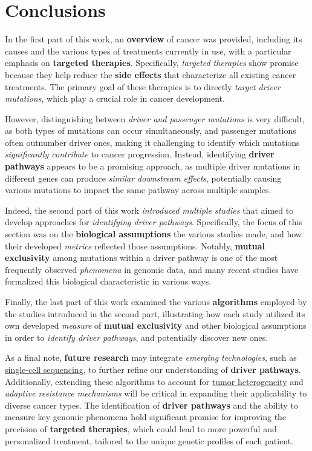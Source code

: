 \chapter*{Conclusions}


In the first part of this work, an \textbf{overview} of cancer was provided, including its causes and the various types of treatments currently in use, with a particular emphasis on \textbf{targeted therapies}. Specifically, \textit{targeted therapies} show promise because they help reduce the \textbf{side effects} that characterize all existing cancer treatments. The primary goal of these therapies is to directly \textit{target driver mutations}, which play a crucial role in cancer development.

However, distinguishing between \textit{driver and passenger mutations} is very difficult, as both types of mutations can occur simultaneously, and passenger mutations often outnumber driver ones, making it challenging to identify which mutations \textit{significantly contribute} to cancer progression. Instead, identifying \textbf{driver pathways} appears to be a promising approach, as multiple driver mutations in different genes can produce \textit{similar downstream effects}, potentially causing various mutations to impact the same pathway across multiple samples.

Indeed, the second part of this work \textit{introduced multiple studies} that aimed to develop approaches for \textit{identifying driver pathways}. Specifically, the focus of this section was on the \textbf{biological assumptions} the various studies made, and how their developed \textit{metrics} reflected those assumptions. Notably, \textbf{mutual exclusivity} among mutations within a driver pathway is one of the most frequently observed \textit{phenomena} in genomic data, and many recent studies have formalized this biological characteristic in various ways.

Finally, the last part of this work examined the various \textbf{algorithms} employed by the studies introduced in the second part, illustrating how each study utilized its own developed \textit{measure} of \textbf{mutual exclusivity} and other biological assumptions in order to \textit{identify driver pathways}, and potentially discover new ones.

As a final note, \textbf{future research} may integrate \textit{emerging technologies}, such as \href{https://en.wikipedia.org/wiki/Single-cell_sequencing}{single-cell sequencing}, to further refine our understanding of \textbf{driver pathways}. Additionally, extending these algorithms to account for \href{https://en.wikipedia.org/wiki/Tumour_heterogeneity}{tumor heterogeneity} and \textit{adaptive resistance mechanisms} will be critical in expanding their applicability to diverse cancer types. The identification of \textbf{driver pathways} and the ability to measure key genomic phenomena hold significant promise for improving the precision of \textbf{targeted therapies}, which could lead to more powerful and personalized treatment, tailored to the unique genetic profiles of each patient.
